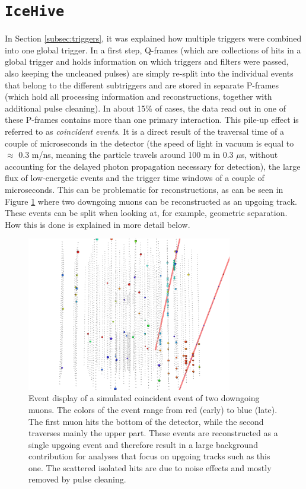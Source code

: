 \section{\texttt{IceHive}}
\label{sec:icehive}
In Section \ref{subsec:triggers}, it was explained how multiple triggers were combined into one global trigger. In a first step, Q-frames (which are collections of hits in a global trigger and holds information on which triggers and filters were passed, also keeping the uncleaned pulses) are simply re-split into the individual events that belong to the different subtriggers and are stored in separate P-frames (which hold all processing information and reconstructions, together with additional pulse cleaning). In about 15\% of cases, the data read out in one of these P-frames contains more than one primary interaction. This pile-up effect is referred to as \textit{coincident events}. It is a direct result of the traversal time of a couple of microseconds in the detector (the speed of light in vacuum is equal to $\approx$ 0.3 m/ns, meaning the particle travels around 100 m in 0.3 $\mu$s, without accounting for the delayed photon propagation necessary for detection), the large flux of low-energetic events and the trigger time windows of a couple of microseconds. This can be problematic for reconstructions, as can be seen in Figure \ref{fig:coincidentevent} where two downgoing muons can be reconstructed as an upgoing track. These events can be split when looking at, for example, geometric separation. How this is done is explained in more detail below.\\

\begin{figure}[t]
\centering
\includegraphics[width=0.8\textwidth]{chapter7/img/coincidenteventsCORS.png}
\caption{Event display of a simulated coincident event of two downgoing muons. The colors of the event range from red (early) to blue (late). The first muon hits the bottom of the detector, while the second traverses mainly the upper part. These events are reconstructed as a single upgoing event and therefore result in a large background contribution for analyses that focus on upgoing tracks such as this one. The scattered isolated hits are due to noise effects and mostly removed by pulse cleaning.}
\label{fig:coincidentevent}
\end{figure}

